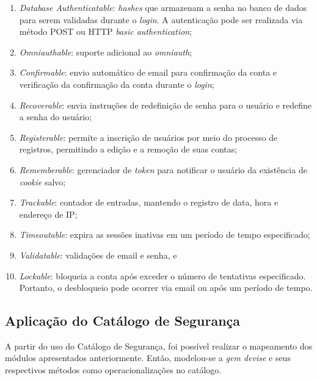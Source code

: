 \begin{enumerate}
	\item \textit{Database Authenticatable}: \textit{hashes} que armazenam a senha no banco de dados para serem validadas durante o \textit{login}. A autenticação pode ser realizada via método POST ou HTTP \textit{basic authentication}; 
	
	\item \textit{Omniauthable}: suporte adicional ao \textit{omniauth};
	
	\item \textit{Confirmable}: envio automático de email para confirmação da conta e verificação da confirmação da conta durante o \textit{login};
	
	\item \textit{Recoverable}: envia instruções de redefinição de senha para o usuário e redefine a senha do usuário;
	
	\item \textit{Registerable}: permite a inscrição de usuários por meio do processo de registros, permitindo a edição e a remoção de suas contas;
	
	\item \textit{Rememberable}: gerenciador de \textit{token} para notificar o usuário da existência de \textit{cookie} salvo;
	
	\item \textit{Trackable}: contador de entradas, mantendo o registro de data, hora e endereço de IP;
	
	\item \textit{Timeoutable}: expira as sessões inativas em um período de tempo especificado;
	
	\item \textit{Validatable}: validações de email e senha, e
	 
	\item \textit{Lockable}: bloqueia a conta após exceder o número de tentativas especificado. Portanto, o desbloqueio pode ocorrer via email ou após um período de tempo. 
\end{enumerate}

\subsection{Aplicação do Catálogo de Segurança}

A partir do uso do Catálogo de Segurança, foi possível realizar o mapeamento dos módulos apresentados anteriormente. Então, modelou-se a \textit{gem devise} e seus respectivos métodos como operacionalizações no catálogo. 

